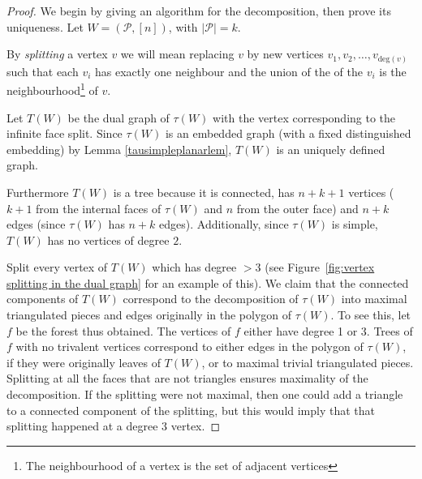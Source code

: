 \documentclass[11pt]{article}
\newcommand{\hlfix}[2]{\texthl{#1}\todo{#2}}
\newcommand{\cP}{\mathcal{P}}
\theoremstyle{remark}
\theoremstyle{definition}
\begin{document}
\begin{proof}
We begin by giving an algorithm for the decomposition, then prove its uniqueness. Let $W = (\cP, [n])$, with $|\cP| = k$.

By \emph{splitting} a vertex $v$ we will mean replacing $v$ by new vertices $v_1, v_2,\ldots, v_{\text{deg}(v)}$ such that each $v_i$ has exactly one neighbour and the union of the of the $v_i$ is the neighbourhood\footnote{The neighbourhood of a vertex is the set of adjacent vertices} of $v$.

Let $T(W)$ be the dual graph of $\tau(W)$ with the vertex corresponding to the infinite face split.
Since $\tau(W)$ is an embedded graph (with a fixed distinguished embedding) by Lemma \ref{tausimpleplanarlem}, $T(W)$ is an uniquely defined graph.

Furthermore $T(W)$ is a tree because it is connected, has $n+k+1$ vertices ($k+1$ from the internal faces of $\tau(W)$ and $n$ from the outer face) and $n+k$ edges (since $\tau(W)$ has $n+k$ edges).  Additionally, since $\tau(W)$ is simple, $T(W)$ has no vertices of degree $2$.  


Split every vertex of $T(W)$ which has degree $>3$ (see Figure~\ref{fig:vertex splitting in the dual graph} for an example of this).
We claim that the connected components of $T(W)$ correspond to the decomposition of $\tau(W)$ into maximal triangulated pieces and edges originally in the polygon of $\tau(W)$.  To see this, let $f$ be the forest thus obtained.
The vertices of $f$ either have degree 1 or 3.
Trees of $f$ with no trivalent vertices correspond to either edges in the polygon of $\tau(W)$, if they were originally leaves of $T(W)$, or to maximal trivial triangulated pieces.
Splitting at all the faces that are not triangles ensures maximality of the decomposition. If the splitting were not maximal, then one could add a triangle to a connected component of the splitting, but this would imply that that splitting happened at a degree $3$ vertex.


\end{proof}
\end{document}

